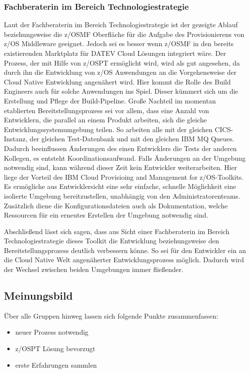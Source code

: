 \subsubsection{Fachberaterin im Bereich Technologiestrategie}
Laut der Fachberaterin im Bereich Technologiestrategie ist der gezeigte Ablauf beziehungsweise die z/OSMF Oberfläche für die Aufgabe des Provisionierens von z/OS Middleware geeignet.
Jedoch sei es besser wenn z/OSMF in den bereits existierenden \glqq Marktplatz\grqq{} für DATEV Cloud Lösungen integriert wäre.
Der Prozess, der mit Hilfe von z/OSPT ermöglicht wird, wird als gut angesehen, da durch ihn die Entwicklung von z/OS Anwendungen an die Vorgehensweise der Cloud Native Entwicklung angenähert wird.
Hier kommt die Rolle des Build Engineers auch für solche Anwendungen ins Spiel.
Dieser kümmert sich um die Erstellung und Pflege der Build-Pipeline.
Große Nachteil im momentan etablierten Bereitstellungsprozess sei vor allem,  dass eine Anzahl von Entwicklern, die parallel an einem Produkt arbeiten, sich die gleiche Entwicklungssystemumgebung teilen.
So arbeiten alle mit der gleichen CICS-Instanz, der gleichen Test-Datenbank und mit den gleichen IBM MQ Queues.
Dadurch beeinflussen Änderungen des einen Entwicklers die Tests der anderen Kollegen, es entsteht Koordinationsaufwand.
Falls Änderungen an der Umgebung notwendig sind, kann während dieser Zeit kein Entwickler weiterarbeiten.
Hier liege der Vorteil des \glqq IBM Cloud Provisioing and Management for z/OS\grqq-Toolkits.
Es ermögliche aus Entwicklersicht eine sehr einfache, schnelle Möglichkeit eine isolierte Umgebung bereitzustellen, unabhängig von den Administratorenteams.
Zusätzlich diene die Konfigurationsdateien auch als Dokumentation, welche Ressourcen für ein erneutes Erstellen der Umgebung notwendig sind.

Abschließend lässt sich sagen, dass aus Sicht einer Fachberaterin im Bereich Technologiestrategie dieses Toolkit die Entwicklung beziehungsweise den Bereitstellungsprozess deutlich verbessern könne.
So sei für den Entwickler ein an die Cloud Native Welt angenäherter Entwicklungsprozess möglich.
Dadurch wird der Wechsel zwischen beiden Umgebungen immer fließender.

\subsection{Meinungsbild}
Über alle Gruppen hinweg lassen sich folgende Punkte zusammenfassen:

\begin{itemize}
\item neuer Prozess notwendig
\item z/OSPT Lösung bevorzugt
\item erste Erfahrungen sammlen
\end{itemize}


